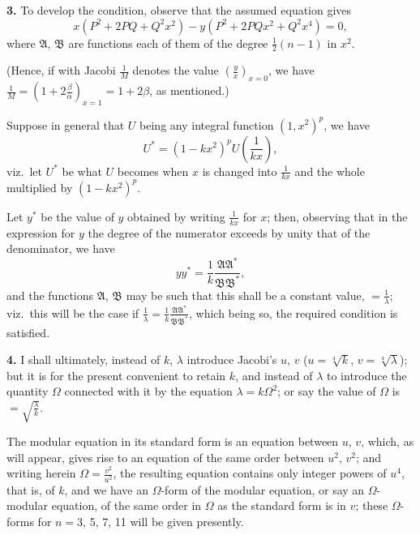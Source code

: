 \documentclass[11pt,a4paper]{book}
\begin{document}
\medskip
\noindent\textbf{3.} To develop the condition, observe that the assumed equation gives
\[
x(P^2 + 2PQ + Q^2x^2) - y(P^2 + 2PQx^2 + Q^2x^4) = 0,
\]
where $\mathfrak{A}$, $\mathfrak{B}$ are functions each of them of the degree $\frac{1}{2}(n - 1)$ in $x^2$.

(Hence, if with Jacobi $\frac{1}{M}$ denotes the value $\left(\frac{y}{x}\right)_{x=0}$, we have $\frac{1}{M} = \left(1 + 2\frac{\beta}{\alpha}\right)_{x=1} = 1 + 2\beta$, as mentioned.)

Suppose in general that $U$ being any integral function $(1, x^2)^p$, we have
\[
U^* = (1 - kx^2)^p U\left(\frac{1}{kx}\right),
\]
viz.\ let $U^*$ be what $U$ becomes when $x$ is changed into $\frac{1}{kx}$ and the whole multiplied by $(1 - kx^2)^p$.

Let $y^*$ be the value of $y$ obtained by writing $\frac{1}{kx}$ for $x$; then, observing that in the expression for $y$ the degree of the numerator exceeds by unity that of the denominator, we have
\[
yy^* = \frac{1}{k}\frac{\mathfrak{A}\mathfrak{A}^*}{\mathfrak{B}\mathfrak{B}^*},
\]
and the functions $\mathfrak{A}$, $\mathfrak{B}$ may be such that this shall be a constant value, $= \frac{1}{\lambda}$; viz.\ this will be the case if $\frac{1}{\lambda} = \frac{1}{k}\frac{\mathfrak{A}\mathfrak{A}^*}{\mathfrak{B}\mathfrak{B}^*}$, which being so, the required condition is satisfied.

\medskip
\noindent\textbf{4.} I shall ultimately, instead of $k$, $\lambda$ introduce Jacobi's $u$, $v$ ($u = \sqrt[4]{k}$, $v = \sqrt[4]{\lambda}$); but it is for the present convenient to retain $k$, and instead of $\lambda$ to introduce the quantity $\Omega$ connected with it by the equation $\lambda = k\Omega^2$; or say the value of $\Omega$ is $= \sqrt{\frac{\lambda}{k}}$.

The modular equation in its standard form is an equation between $u$, $v$, which, as will appear, gives rise to an equation of the same order between $u^2$, $v^2$; and writing herein $\Omega = \frac{v^2}{u^2}$, the resulting equation contains only integer powers of $u^4$, that is, of $k$, and we have an $\Omega$-form of the modular equation, or say an $\Omega$-modular equation, of the same order in $\Omega$ as the standard form is in $v$; these $\Omega$-forms for $n = 3$, 5, 7, 11 will be given presently.
\end{document}
